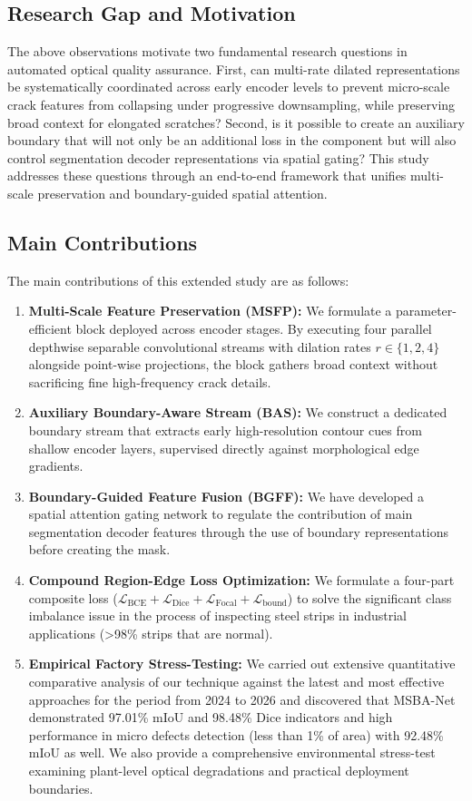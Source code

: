 \documentclass{ieeeaccess}
\begin{document}
\subsection{Research Gap and Motivation}
\label{sec:intro_gap}
The above observations motivate two fundamental research questions in automated optical quality assurance. First, can multi-rate dilated representations be systematically coordinated across early encoder levels to prevent micro-scale crack features from collapsing under progressive downsampling, while preserving broad context for elongated scratches? Second, is it possible to create an auxiliary boundary that will not only be an additional loss in the component but will also control segmentation decoder representations via spatial gating? This study addresses these questions through an end-to-end framework that unifies multi-scale preservation and boundary-guided spatial attention.

\subsection{Main Contributions}
\label{sec:intro_contributions}
The main contributions of this extended study are as follows:
\begin{enumerate}
    \item \textbf{Multi-Scale Feature Preservation (MSFP):} We formulate a parameter-efficient block deployed across encoder stages. By executing four parallel depthwise separable convolutional streams with dilation rates $r \in \{1, 2, 4\}$ alongside point-wise projections, the block gathers broad context without sacrificing fine high-frequency crack details.
    \item \textbf{Auxiliary Boundary-Aware Stream (BAS):} We construct a dedicated boundary stream that extracts early high-resolution contour cues from shallow encoder layers, supervised directly against morphological edge gradients.
    \item \textbf{Boundary-Guided Feature Fusion (BGFF):} We have developed a spatial attention gating network to regulate the contribution of main segmentation decoder features through the use of boundary representations before creating the mask. 
    \item \textbf{Compound Region-Edge Loss Optimization:} We formulate a four-part composite loss ($\mathcal{L}_{\text{BCE}} + \mathcal{L}_{\text{Dice}} + \mathcal{L}_{\text{Focal}} + \mathcal{L}_{\text{bound}}$) to solve the significant class imbalance issue in the process of inspecting steel strips in industrial applications (>98\% strips that are normal).
\item \textbf{Empirical Factory Stress-Testing:} We carried out extensive quantitative comparative analysis of our technique against the latest and most effective approaches for the period from 2024 to 2026 and discovered that MSBA-Net demonstrated 97.01\% mIoU and 98.48\% Dice indicators and high performance in micro defects detection (less than 1\% of area) with 92.48\% mIoU as well. We also provide a comprehensive environmental stress-test examining plant-level optical degradations and practical deployment boundaries.
\end{enumerate}
\end{document}
